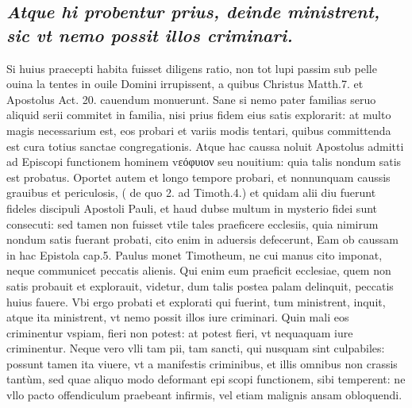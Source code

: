 \documentclass{article}
\begin{document}
\begin{pages}
\subsection*{\textit{Atque hi probentur prius, deinde ministrent, sic vt nemo possit illos criminari. }}\pstart Si huius praecepti habita fuisset diligens ratio, non tot lupi passim sub pelle ouina la tentes in ouile Domini irrupissent, a quibus Christus Matth.7. et Apostolus Act. 20. cauendum monuerunt. Sane si nemo pater familias seruo aliquid serii commitet in familia, nisi prius fidem eius satis explorarit: at multo magis necessarium est, eos probari et variis modis tentari, quibus committenda est cura totius sanctae congregationis. Atque hac caussa noluit Apostolus admitti ad Episcopi functionem hominem vεόφυιον seu nouitium: quia talis nondum satis est probatus. Oportet autem et longo tempore probari, et nonnunquam caussis grauibus et periculosis, ( de quo 2. ad Timoth.4.) et quidam alii diu fuerunt fideles discipuli Apostoli Pauli, et haud dubse multum in mysterio fidei sunt consecuti: sed tamen non fuisset vtile tales praeficere ecclesiis, quia nimirum nondum satis fuerant probati, cito enim in aduersis defecerunt, Eam ob caussam in hac Epistola cap.5. Paulus monet Timotheum, ne cui manus cito imponat, neque communicet peccatis alienis. Qui enim eum praeficit ecclesiae, quem non satis probauit et explorauit, videtur, dum talis postea palam delinquit, peccatis huius fauere. Vbi ergo probati et explorati qui fuerint, tum ministrent, inquit, atque ita ministrent, vt nemo possit illos iure criminari. Quin mali eos criminentur vspiam, fieri non potest: at potest fieri, vt nequaquam iure criminentur. Neque vero vlli tam pii, tam sancti, qui nusquam sint culpabiles: possunt tamen ita viuere, vt a manifestis criminibus, et illis omnibus non crassis tantùm, sed quae aliquo modo deformant epi scopi functionem, sibi temperent: ne vllo pacto offendiculum praebeant infirmis, vel etiam malignis ansam obloquendi.  \pend
{}
{}

\end{pages}
\end{document}
